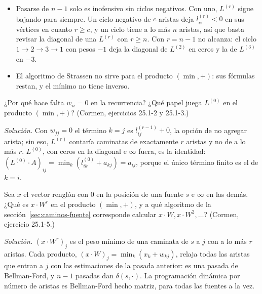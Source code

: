 \documentclass[11pt,letterpaper]{article}
\begin{document}
\begin{ojo}
  \begin{itemize}[itemsep=0.2em, leftmargin=1.2em]
    \item Pasarse de $n - 1$ solo es inofensivo sin ciclos negativos.
          Con uno, $L^{(r)}$ sigue bajando para siempre. Un ciclo
          negativo de $c$ aristas deja $l^{(r)}_{ii} < 0$ en sus
          vértices en cuanto $r \ge c$, y un ciclo tiene a lo más $n$
          aristas, así que basta revisar la diagonal de una $L^{(r)}$
          con $r \ge n$. Con $r = n - 1$ no alcanza: el ciclo
          $1 \to 2 \to 3 \to 1$ con pesos $-1$ deja la diagonal de
          $L^{(2)}$ en ceros y la de $L^{(3)}$ en $-3$.
    \item El algoritmo de Strassen no sirve para el producto
          $(\min, +)$: sus fórmulas restan, y el mínimo no tiene
          inverso.
  \end{itemize}
\end{ojo}

\begin{ejercicio}
  ¿Por qué hace falta $w_{ii} = 0$ en la recurrencia? ¿Qué papel juega
  $L^{(0)}$ en el producto $(\min, +)$? (Cormen, ejercicios 25.1-2 y
  25.1-3.)

  \emph{Solución.} Con $w_{jj} = 0$ el término $k = j$ es
  $l^{(r-1)}_{ij} + 0$, la opción de no agregar arista; sin eso,
  $L^{(r)}$ contaría caminatas de exactamente $r$ aristas y no de a lo
  más $r$. $L^{(0)}$, con ceros en la diagonal e $\infty$ fuera, es la
  identidad: $(L^{(0)} \cdot A)_{ij} = \min_k (l^{(0)}_{ik} + a_{kj})
  = a_{ij}$, porque el único término finito es el de $k = i$.
\end{ejercicio}

\begin{ejercicio}
  Sea $x$ el vector renglón con $0$ en la posición de una fuente $s$ e
  $\infty$ en las demás. ¿Qué es $x \cdot W^r$ en el producto
  $(\min, +)$, y a qué algoritmo de la
  sección~\ref{sec:caminos-fuente} corresponde calcular
  $x \cdot W, x \cdot W^2, \dots$? (Cormen, ejercicio 25.1-5.)

  \emph{Solución.} $(x \cdot W^r)_j$ es el peso mínimo de una caminata
  de $s$ a $j$ con a lo más $r$ aristas. Cada producto,
  $(x \cdot W)_j = \min_k (x_k + w_{kj})$, relaja todas las aristas
  que entran a $j$ con las estimaciones de la pasada anterior: es una
  pasada de Bellman-Ford, y $n - 1$ pasadas dan $\delta(s, \cdot)$. La
  programación dinámica por número de aristas es Bellman-Ford hecho
  matriz, para todas las fuentes a la vez.
\end{ejercicio}
\end{document}
